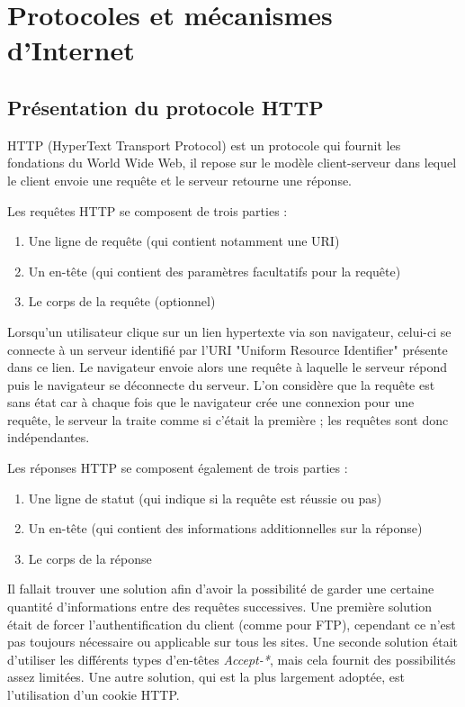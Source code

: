 \chapter{Protocoles et mécanismes d'Internet}

\section{Présentation du protocole HTTP}
\label{http-expl}
HTTP (HyperText Transport Protocol) \cite{Obo_CNP3} est un protocole qui fournit les fondations du World Wide Web, il repose sur le modèle client-serveur dans lequel le client envoie une requête et le serveur retourne une réponse.
\newline

Les requêtes HTTP se composent de trois parties :
\begin{enumerate}
	\item Une ligne de requête (qui contient notamment une URI)
	\item Un en-tête (qui contient des paramètres facultatifs pour la requête)
	\item Le corps de la requête (optionnel)
	\newline
\end{enumerate}

Lorsqu'un utilisateur clique sur un lien hypertexte via son navigateur, celui-ci se connecte à un serveur identifié par l'URI "Uniform Resource Identifier" présente dans ce lien. Le navigateur envoie alors une requête à laquelle le serveur répond puis le navigateur se déconnecte du serveur.
L'on considère que la requête est sans état car à chaque fois que le navigateur crée une connexion pour une requête, le serveur la traite comme si c'était la première ; les requêtes sont donc indépendantes.
\newline

Les réponses HTTP se composent également de trois parties :
\begin{enumerate}
	\item Une ligne de statut (qui indique si la requête est réussie ou pas)
	\item Un en-tête (qui contient des informations additionnelles sur la réponse)
	\item Le corps de la réponse
	\newline
\end{enumerate}

Il fallait trouver une solution afin d'avoir la possibilité de garder une certaine quantité d'informations entre des requêtes successives. Une première solution était de forcer l'authentification du client (comme pour FTP), cependant ce n'est pas toujours nécessaire ou applicable sur tous les sites. Une seconde solution était d'utiliser les différents types d'en-têtes \emph{Accept-*}, mais cela fournit des possibilités assez limitées. Une autre solution, qui est la plus largement adoptée, est l'utilisation d'un cookie HTTP.

